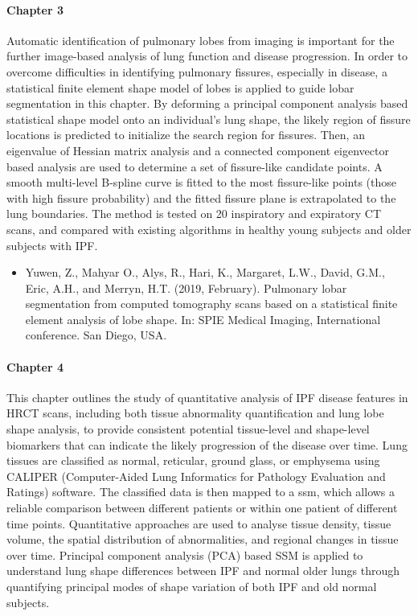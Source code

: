 \paragraph{Chapter 3} Automatic identification of pulmonary lobes from imaging is important for the further image-based analysis of lung function and disease progression. In order to overcome difficulties in identifying pulmonary fissures, especially in disease, a statistical finite element shape model of lobes is applied to guide lobar segmentation in this chapter. By deforming a principal component analysis based statistical shape model onto an individual’s lung shape, the likely region of fissure locations is predicted to initialize the search region for fissures. Then, an eigenvalue of Hessian matrix analysis and a connected component eigenvector based analysis are used to determine a set of fissure-like candidate points. A smooth multi-level B-spline curve is fitted to the most fissure-like points (those with high fissure probability) and the fitted fissure plane is extrapolated to the lung boundaries. The method is tested on 20 inspiratory and expiratory CT scans, and compared with existing algorithms in healthy young subjects and older subjects with IPF.

\begin{itemize}
  \item Yuwen, Z., Mahyar O., Alys, R., Hari, K., Margaret, L.W., David, G.M., Eric, A.H., and Merryn, H.T. (2019, February). Pulmonary lobar segmentation from computed tomography scans based on a statistical finite element analysis of lobe shape. In: SPIE Medical Imaging, International conference. San Diego, USA.
\end{itemize}

\paragraph{Chapter 4} This chapter outlines the study of quantitative analysis of IPF disease features in HRCT scans, including both tissue abnormality quantification and lung lobe shape analysis, to provide consistent potential tissue-level and shape-level biomarkers that can indicate the likely progression of the disease over time. Lung tissues are classified as normal, reticular, ground glass, or emphysema using CALIPER (Computer-Aided Lung Informatics for Pathology Evaluation and Ratings) software. The classified data is then mapped to a \gls{ssm}, which allows a reliable comparison between different patients or within one patient of different time points. Quantitative approaches are used to analyse tissue density, tissue volume, the spatial distribution of abnormalities, and regional changes in tissue over time. Principal component analysis (PCA) based SSM is applied to understand lung shape differences between IPF and normal older lungs through quantifying principal modes of shape variation of both IPF and old normal subjects. 

